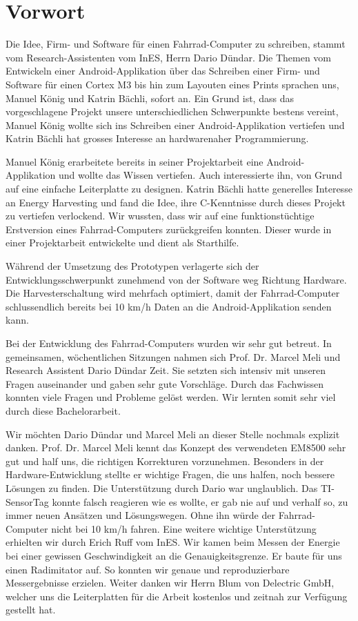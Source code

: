 ﻿\chapter{Vorwort}

Die Idee, Firm- und Software für einen Fahrrad-Computer zu schreiben, stammt vom Research-Assistenten vom InES, Herrn Dario Dündar. Die Themen vom Entwickeln einer Android-Applikation über das Schreiben einer Firm- und Software für einen Cortex M3 bis hin zum Layouten eines Prints sprachen uns, Manuel König und Katrin Bächli, sofort an. Ein Grund ist, dass das vorgeschlagene Projekt unsere unterschiedlichen Schwerpunkte bestens vereint, Manuel König wollte sich ins Schreiben einer Android-Applikation vertiefen und Katrin Bächli hat grosses Interesse an hardwarenaher Programmierung. 

Manuel König erarbeitete bereits in seiner Projektarbeit eine Android-Applikation und wollte das Wissen vertiefen. Auch interessierte ihn, von Grund auf eine einfache Leiterplatte zu designen. Katrin Bächli hatte generelles Interesse an Energy Harvesting und fand die Idee, ihre C-Kenntnisse durch dieses Projekt zu vertiefen verlockend. Wir wussten, dass wir auf eine funktionstüchtige Erstversion eines Fahrrad-Computers zurückgreifen konnten. Dieser wurde in einer Projektarbeit entwickelte und dient als Starthilfe. 

Während der Umsetzung des Prototypen verlagerte sich der Entwicklungsschwerpunkt zunehmend von der Software weg Richtung Hardware. Die Harvesterschaltung wird mehrfach optimiert, damit der Fahrrad-Computer schlussendlich bereits bei 10 km/h Daten an die Android-Applikation senden kann. 

Bei der Entwicklung des Fahrrad-Computers wurden wir sehr gut betreut. In gemeinsamen, wöchentlichen Sitzungen nahmen sich Prof. Dr. Marcel Meli und Research Assistent Dario Dündar Zeit. Sie setzten sich intensiv mit unseren Fragen auseinander und gaben sehr gute Vorschläge. Durch das Fachwissen konnten viele Fragen und Probleme gelöst werden. Wir lernten somit sehr viel durch diese Bachelorarbeit. 

Wir möchten Dario Dündar und Marcel Meli an dieser Stelle nochmals explizit danken. Prof. Dr. Marcel Meli kennt das Konzept des verwendeten EM8500 sehr gut und half uns, die richtigen Korrekturen vorzunehmen. Besonders in der Hardware-Entwicklung stellte er wichtige Fragen, die uns halfen, noch bessere Lösungen zu finden. Die Unterstützung durch Dario war unglaublich. Das TI-SensorTag konnte falsch reagieren wie es wollte, er gab nie auf und verhalf so, zu immer neuen Ansätzen und Lösungswegen. Ohne ihn würde der Fahrrad-Computer nicht bei 10 km/h fahren. Eine weitere wichtige Unterstützung erhielten wir durch Erich Ruff vom InES. Wir kamen beim Messen der Energie bei einer gewissen Geschwindigkeit an die Genauigkeitsgrenze. Er baute für uns einen Radimitator auf. So konnten wir genaue und reproduzierbare Messergebnisse erzielen. Weiter danken wir Herrn Blum von Delectric GmbH, welcher uns die Leiterplatten für die Arbeit kostenlos und zeitnah zur Verfügung gestellt hat. 

